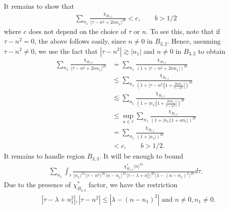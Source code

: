 \documentclass[12pt,reqno]{amsart}
\numberwithin{equation}{section}  %
\begin{document}
%
%
%
It remains to show that 
%
%
%
\begin{equation}
  \label{sum-bound}
\begin{split}
\sum_{n_{1} } \frac{\chi_{B_{3,2}}}{\langle \tau - n^{2} + 2nn_{1}
\rangle^{2b} } < c, \qquad b > 1/2
\end{split}
\end{equation}
%
%
where $c$ does not depend on the choice of $\tau$ or $n$. 
%
%
To see this, note that if $\tau - n^{2} = 0$, the above follows easily, since
$n \neq 0$ in $B_{3,2}$.
Hence, assuming $\tau - n^{2} \neq 0$, we use the fact that $| \tau - n^{2} |
\gtrsim | n_{1} |$ and $n \neq 0$ in $B_{3,2}$ to obtain 
%
%
\begin{equation*}
\begin{split}
\sum_{n_{1}} \frac{\chi_{B_{3,2}}}{\langle \tau - n^{2} + 2nn_{1}
\rangle^{2b} }
& = \sum_{n_{1}} \frac{\chi_{B_{3,2}}}{(1 + | \tau - n^{2} +
2nn_{1} |)^{2b}}
\\
& \le \sum_{n_{1}} \frac{\chi_{B_{3,2}}}{(1 + | \tau - n^{2}
| | 1 + \frac{2nn_{1}}{\tau - n^{2}} |)^{2b}}
\\
& \lesssim \sum_{n_{1}} \frac{\chi_{B_{3,2}}}{(1 + |n_{1}|
| 1 + \frac{2nn_{1}}{\tau - n^{2}} |)^{2b}}
\\
& \le \sup_{a \in \tau} \sum_{n_{1}} \frac{\chi_{B_{3,2}}}{(1 + |n_{1}|
| 1 + an_{1}|)^{2b} }
\\
& = \sum_{n_{1}} \frac{\chi_{B_{3,2}}}{(1 + |n_{1}|)^{2b}}
\\
& < c, \qquad b > 1/2.
\end{split}
\end{equation*}
%
%
It remains to handle region $B_{3,3}$. It will be enough to bound
%
%
\begin{equation}
  \label{region-B-3-star-split}
\begin{split}
   \sum_{n_{1}} \int_{\tau} \frac{\chi^{*}_{B_{3,3}}
    \langle n \rangle ^{2s}
    }{ \langle n_{1} \rangle^{2s} \langle  \tau  - n^{2}
    \rangle ^{2a}  \langle
n-n_{1} \rangle ^{2s}  \langle  \tau - \lambda+n_{1}^{2}
\rangle^{2b} \langle   \lambda  -(n - n_{1})^{2}
\rangle^{2b} } d \tau.
\end{split}
\end{equation}
%
Due to the presence of $\chi^{*}_{B_{3,3}}$ factor, we have the restriction
%
%
\begin{equation*}
\begin{split}
& |\tau - \lambda +n_{1}^2|, | \tau - n^{2} | \le |  \lambda -
(n - n_{1})^{2} | \text{ and }  n \neq 0, n_1 \neq 0.
\end{split}
\end{equation*}
\end{document}
